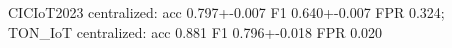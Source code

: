 CICIoT2023 centralized: acc 0.797+-0.007 F1 0.640+-0.007 FPR 0.324; TON_IoT centralized: acc 0.881 F1 0.796+-0.018 FPR 0.020
